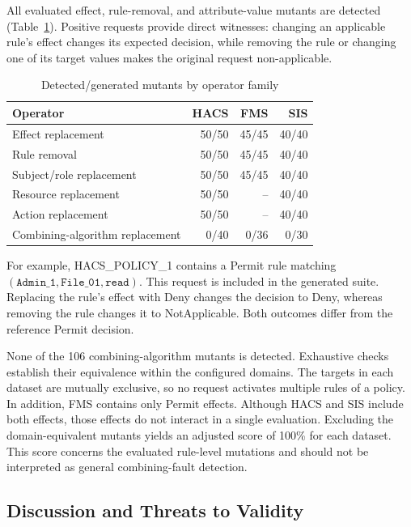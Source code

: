 All evaluated effect, rule-removal, and attribute-value mutants are
detected (Table~\ref{tab:exp_operators}). Positive requests provide
direct witnesses: changing an applicable rule's effect changes its
expected decision, while removing the rule or changing one of its
target values makes the original request non-applicable.

\begin{table}[htbp]
\centering
\caption{Detected/generated mutants by operator family}
\label{tab:exp_operators}
\small
\begin{tabular}{lrrr}
\hline
Operator & HACS & FMS & SIS \\
\hline
Effect replacement & 50/50 & 45/45 & 40/40 \\
Rule removal & 50/50 & 45/45 & 40/40 \\
Subject/role replacement & 50/50 & 45/45 & 40/40 \\
Resource replacement & 50/50 & -- & 40/40 \\
Action replacement & 50/50 & -- & 40/40 \\
Combining-algorithm replacement & 0/40 & 0/36 & 0/30 \\
\hline
\end{tabular}
\end{table}

For example, HACS\_POLICY\_1 contains a Permit rule matching
$(\texttt{Admin\_1},\texttt{File\_01},\texttt{read})$.
This request is included in the generated suite. Replacing the rule's
effect with Deny changes the decision to Deny, whereas removing the
rule changes it to NotApplicable. Both outcomes differ from the
reference Permit decision.

None of the 106 combining-algorithm mutants is detected. Exhaustive
checks establish their equivalence within the configured domains.
The targets in each dataset are mutually exclusive, so no request
activates multiple rules of a policy. In addition, FMS contains only
Permit effects. Although HACS and SIS include both effects, those
effects do not interact in a single evaluation. Excluding the
domain-equivalent mutants yields an adjusted score of 100\% for
each dataset. This score concerns the evaluated rule-level mutations
and should not be interpreted as general combining-fault detection.

\subsection{Discussion and Threats to Validity}
\label{subsec:exp_threats}

